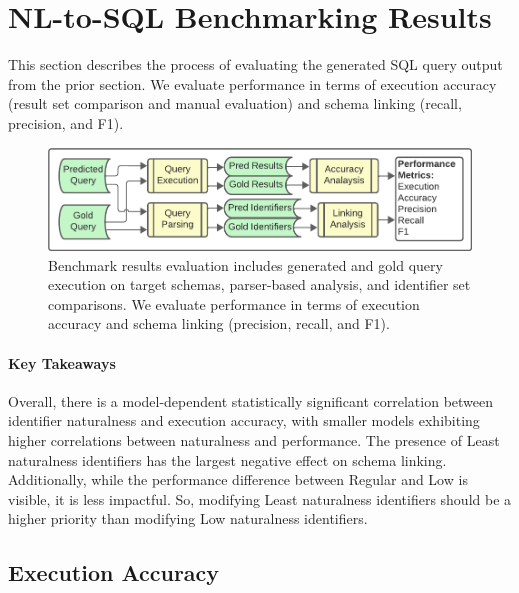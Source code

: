 \section{NL-to-SQL Benchmarking Results}

\label{section:nl-to-sql-benchmarking-results}

This section describes the process of evaluating the generated SQL query output from the prior section.
We evaluate performance in terms of execution accuracy (result set comparison and manual evaluation) and schema linking (recall, precision, and F1).

\begin{figure}[!h]
  \centering
  \includegraphics[width=\figwidthmod\linewidth]{figures/section-6-process-header.pdf}
  \caption{Benchmark results evaluation includes generated and gold query execution on target schemas, parser-based analysis, and identifier set comparisons. We evaluate performance in terms of execution accuracy and schema linking (precision, recall, and F1).}
\end{figure}

\paragraph{\textbf{Key Takeaways}}
Overall, there is a model-dependent statistically significant correlation between identifier naturalness and execution accuracy, with smaller models exhibiting higher correlations between naturalness and performance.
The presence of Least naturalness identifiers has the largest negative effect on schema linking.
Additionally, while the performance difference between Regular and Low is visible, it is less impactful. 
So, modifying Least naturalness identifiers should be a  higher priority than modifying Low naturalness identifiers.

\subsection{Execution Accuracy}

